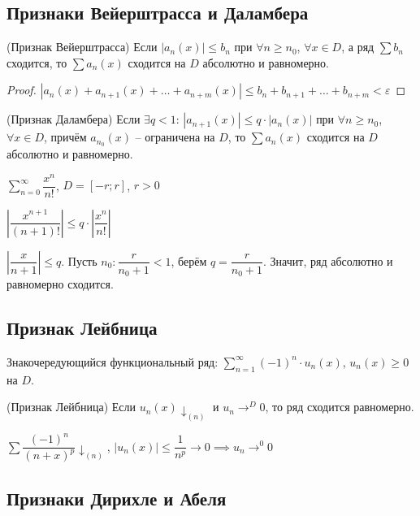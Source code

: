 \subsection{Признаки Вейерштрасса и Даламбера}
\begin{theorem}
(Признак Вейерштрасса) Если $|a_n(x)| \leq b_n$ при $\forall n \geq n_0$, $\forall x \in D$, а ряд $\sum b_n$ сходится, то $\sum a_n(x)$ сходится на $D$ абсолютно и равномерно.
\end{theorem}

\begin{proof}
$|a_n(x) + a_{n + 1}(x) + \dots + a_{n + m}(x)| \leq b_n + b_{n+1} + \dots + b_{n + m} < \varepsilon$
\end{proof}

\begin{theorem}
(Признак Даламбера) Если $\exists q < 1$: $|a_{n+1}(x)| \leq q \cdot |a_n(x)|$ при $\forall n \geq n_0$, $\forall x \in D$, причём $a_{n_0}(x)$ -- ограничена на $D$, то $\sum a_n(x)$ сходится на $D$ абсолютно и равномерно.
\end{theorem}

\begin{example}
$\sum_{n = 0}^{\infty} \dfrac{x^n}{n!}$, $D=[-r; r]$, $r > 0$

$\left|\dfrac{x^{n + 1}}{(n + 1)!}\right| \leq q \cdot \left|\dfrac{x^n}{n!}\right|$

$\left|\dfrac{x}{n + 1}\right| \leq q$. Пусть $n_0: \dfrac{r}{n_0 + 1} < 1$, берём $q = \dfrac{r}{n_0 + 1}$. Значит, ряд абсолютно и равномерно сходится.
\end{example}

\subsection{Признак Лейбница}

Знакочередующийся функциональный ряд: $\sum_{n=1}^{\infty} (-1)^n \cdot u_n(x)$, $u_n(x) \geq 0$ на $D$.

\begin{theorem}
(Признак Лейбница) Если $u_n(x) \downarrow_{(n)}$ и $u_n \to^D 0$, то ряд сходится равномерно.
\end{theorem}

\begin{example}
$\sum \dfrac{(-1)^n}{(n + x)^p} \downarrow_{(n)}$, $|u_n(x)| \leq \dfrac{1}{n^p} \to 0 \implies u_n \to^0 0$ 
\end{example}

\subsection{Признаки Дирихле и Абеля}

